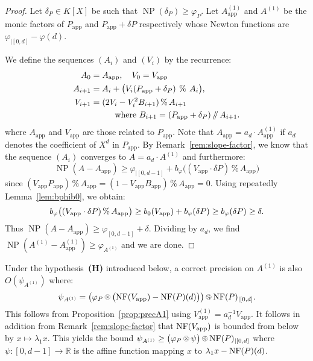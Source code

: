 \documentclass{sig-alternate-05-2015}
\DeclareMathOperator{\NP}{NP}
\newcommand{\R}{\mathbb R}
\newcommand{\NF}{\text{\rm NF}}
\renewcommand{\mod}{\,\%\,}
\renewcommand{\div}{\,/\hspace{-0.3em}/\,}
\newcommand{\nfop}[1]{%
\raisebox{-0.1mm}{\begin{tikzpicture}
\draw[transparent] (-0.18,0)--(0.18,0);
\draw[very thin] (0,0) circle (0.11cm);
\begin{scope}
\clip (0,0) circle (0.11cm);
\node[scale=0.75] at (0,0) { $#1$ };
\end{scope}
\end{tikzpicture}}}
\newcommand{\nftimes}{\nfop\times}
\newcommand{\nfmod}{\nfop\mod}
\newcommand{\app}{\textrm{app}}
\begin{document}
\begin{proof}
Let $\delta_P \in K[X]$ be such that $\NP(\delta_P) \geq \varphi_P$.
Let $A_\app^{(1)}$ and $A^{(1)}$ be the monic factors of $P_\app$
and $P_\app + \delta P$ respectively whose Newton functions are
$\varphi_{|[0,d]} - \varphi(d)$.

We define the sequences $(A_i)$ and $(V_i)$ by the recurrence: 
\begin{align*} 
A_0 & = A_\app, \quad V_{0} = V_\app \medskip \\ A_{i+1} 
&= A_i + \big(V_i (P_\app + \delta_P) \:\mod\: A_i\big), \smallskip \\ 
V_{i+1} &= (2 V_i -V_i^2 B_{i+1} ) \mod A_{i+1} \\ 
&  \hspace{1cm}\text{where } B_{i+1} = (P_\app + \delta_P) \div A_{i+1}. 
\end{align*} 
where $A_\app$ and $V_\app$ are those related to $P_\app$. Note that 
$A_\app = a_d \cdot A^{(1)}_\app$ if $a_d$ denotes the coefficient of 
$X^d$ in $P_\app$. By Remark~\ref{rem:slope-factor}, we know that the 
sequence $(A_i)$ converges to $A = a_d \cdot A^{(1)}$ and furthermore:
$$\NP(A - A_\app) \geq \varphi_{|[0,d{-}1]} + 
b_\varphi\big((V_\app \cdot \delta P) \mod A_\app\big)$$ 
since $(V_\app P_\app) \mod A_\app = (1 - V_\app B_\app) \mod A_\app = 
0$. Using repeatedly Lemma~\ref{lem:bphib0}, we obtain:
$$b_\varphi\big((V_\app \cdot \delta P) \mod A_\app\big)
  \geq b_0(V_\app) + b_\varphi(\delta P) \\
  \geq b_\varphi(\delta P) \geq \delta.$$
Thus $\NP(A - A_\app) \geq \varphi_{[0,d{-}1]} + \delta$. Dividing
by $a_d$, we find
$\NP(A^{(1)} - A^{(1)}_\app) \geq \varphi_{A^{(1)}}$ and we are done.
\end{proof}

\begin{rem}
Under the hypothesis~\textbf{(H)} introduced below, a correct precision 
on $A^{(1)}$ is also $O(\psi_{A^{(1)}})$ where:
$$\psi_{A^{(1)}} = \big(\varphi_P \nftimes \big(\NF(V_\app)
- \NF(P)(d)\big)\big) \nfmod \NF(P)_{|[0,d]}.$$
This follows from Proposition~\ref{prop:precA1} using
$V^{(1)}_\app = a_d^{-1} V_\app$. It follows in addition from 
Remark~\ref{rem:slope-factor} that $\NF(V_\app)$ is bounded from below 
by $x \mapsto \lambda_1 x$. This yields the bound
$\psi_{A^{(1)}} \geq \big(\varphi_P \nftimes \psi\big) \nfmod 
\NF(P)_{|[0,d]}$
where $\psi : [0,d{-}1] \to \R$ is the affine function mapping $x$
to $\lambda_1 x - \NF(P)(d)$. 
\end{rem}
\end{document}
